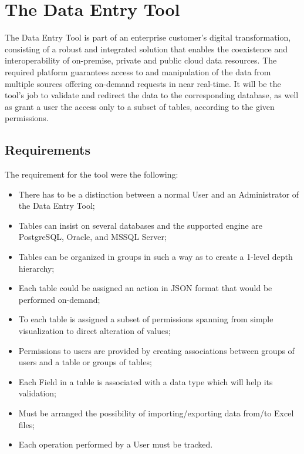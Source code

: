 \graphicspath{{images/}}
\chapter{The Data Entry Tool}
The Data Entry Tool is part of an enterprise customer's digital transformation, consisting of a robust and integrated solution that enables the coexistence and interoperability of on-premise, private and public cloud data resources. The required platform guarantees access to and manipulation of the data from multiple sources offering on-demand requests in near real-time. It will be the tool's job to validate and redirect the data to the corresponding database, as well as grant a user the access only to a subset of tables, according to the given permissions.

\section{Requirements}
The requirement for the tool were the following:
\begin{itemize}
    \item There has to be a distinction between a normal User and an Administrator of the Data Entry Tool;
    \item Tables can insist on several databases and the supported engine are PostgreSQL, Oracle, and MSSQL Server;
    \item Tables can be organized in groups in such a way as to create a 1-level depth hierarchy;
    \item Each table could be assigned an action in JSON format that would be performed on-demand;
    \item To each table is assigned a subset of permissions spanning from simple visualization to direct alteration of values;
    \item Permissions to users are provided by creating associations between groups of users and a table or groups of tables;
    \item Each Field in a table is associated with a data type which will help its validation;
    \item Must be arranged the possibility of importing/exporting data from/to Excel files;
    \item Each operation performed by a User must be tracked.
\end{itemize}


